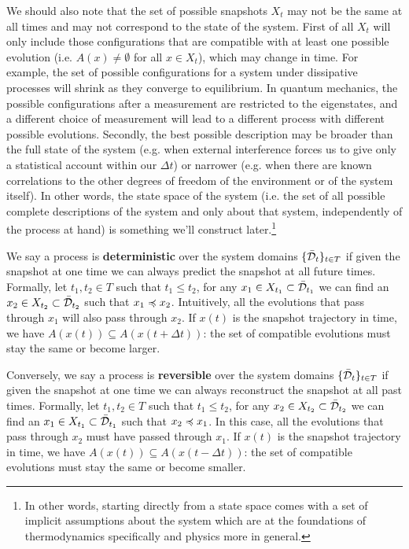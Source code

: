 \documentclass[letterpaper]{article}
\begin{document}
We should also note that the set of possible snapshots $X_t$ may not be the same at all times and may not correspond to the state of the system. First of all $X_t$ will only include those configurations that are compatible with at least one possible evolution (i.e. $A(x) \neq \emptyset$ for all $x \in X_t$), which may change in time. For example, the set of possible configurations for a system under dissipative processes will shrink as they converge to equilibrium. In quantum mechanics, the possible configurations after a measurement are restricted to the eigenstates, and a different choice of measurement will lead to a different process with different possible evolutions. Secondly, the best possible description may be broader than the full state of the system (e.g. when external interference forces us to give only a statistical account within our $\Delta t$) or narrower (e.g. when there are known correlations to the other degrees of freedom of the environment or of the system itself). In other words, the state space of the system (i.e. the set of all possible complete descriptions of the system and only about that system, independently of the process at hand) is something we'll construct later.\footnote{In other words, starting directly from a state space comes with a set of implicit assumptions about the system which are at the foundations of thermodynamics specifically and physics more in general.}

We say a process is \textbf{deterministic} over the system domains $\{\bar{\mathcal{D}}_t\}_{t \in T}$ if given the snapshot at one time we can always predict the snapshot at all future times. Formally, let $t_1, t_2 \in T$ such that $t_1 \leq t_2$, for any $x_1 \in X_{t_1} \subset \bar{\mathcal{D}}_{t_1}$ we can find an $x_2 \in X_{t_2} \subset \bar{\mathcal{D}}_{t_2}$ such that $x_1 \preccurlyeq x_2$. Intuitively, all the evolutions that pass through $x_1$ will also pass through $x_2$. If $x(t)$ is the snapshot trajectory in time, we have $A(x(t)) \subseteq A(x(t + \Delta t))$: the set of compatible evolutions must stay the same or become larger.

Conversely, we say a process is \textbf{reversible} over the system domains $\{\bar{\mathcal{D}}_t\}_{t \in T}$ if given the snapshot at one time we can always reconstruct the snapshot at all past times. Formally, let $t_1, t_2 \in T$ such that $t_1 \leq t_2$, for any $x_2 \in X_{t_2} \subset \bar{\mathcal{D}}_{t_2}$ we can find an $x_1 \in X_{t_1} \subset \bar{\mathcal{D}}_{t_1}$ such that $x_2 \preccurlyeq x_1$. In this case, all the evolutions that pass through $x_2$ must have passed through $x_1$. If $x(t)$ is the snapshot trajectory in time, we have $A(x(t)) \subseteq A(x(t - \Delta t))$: the set of compatible evolutions must stay the same or become smaller.
\end{document}
